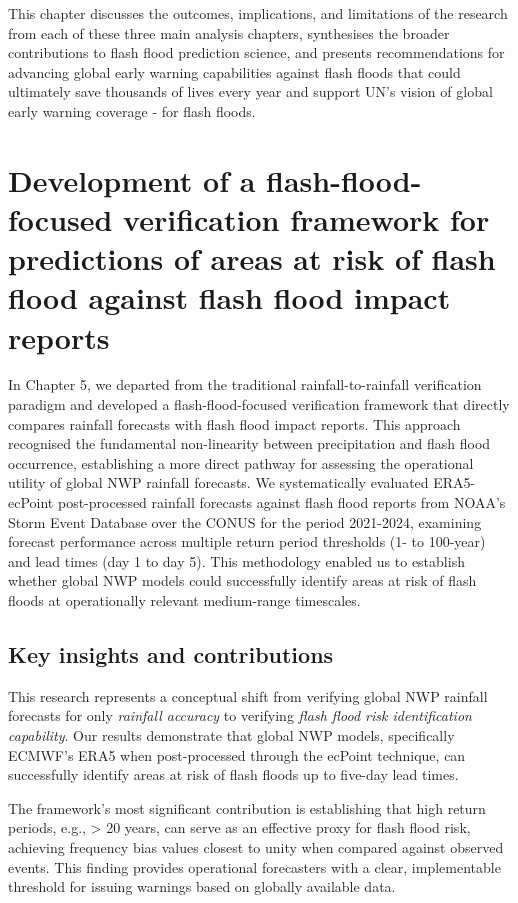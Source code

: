 This chapter discusses the outcomes, implications, and limitations of the research from each of these three main analysis chapters, synthesises the broader contributions to flash flood prediction science, and presents recommendations for advancing global early warning capabilities against flash floods that could ultimately save thousands of lives every year and support UN's vision of global early warning coverage - for flash floods.


\section{Development of a flash-flood-focused verification framework for predictions of areas at risk of flash flood against flash flood impact reports}

In Chapter 5, we departed from the traditional rainfall-to-rainfall verification paradigm and developed a flash-flood-focused verification framework that directly compares rainfall forecasts with flash flood impact reports. This approach recognised the fundamental non-linearity between precipitation and flash flood occurrence, establishing a more direct pathway for assessing the operational utility of global NWP rainfall forecasts. We systematically evaluated ERA5-ecPoint post-processed rainfall forecasts against flash flood reports from NOAA's Storm Event Database over the CONUS for the period 2021-2024, examining forecast performance across multiple return period thresholds (1- to 100-year) and lead times (day 1 to day 5). This methodology enabled us to establish whether global NWP models could successfully identify areas at risk of flash floods at operationally relevant medium-range timescales.

\subsection{Key insights and contributions}

This research represents a conceptual shift from verifying global NWP rainfall forecasts for only \textit{rainfall accuracy} to verifying \textit{flash flood risk identification capability}. Our results demonstrate that global NWP models, specifically ECMWF's ERA5 when post-processed through the ecPoint technique, can successfully identify areas at risk of flash floods up to five-day lead times. %

The framework's most significant contribution is establishing that high return periods, e.g., > 20 years, can serve as an effective proxy for flash flood risk, achieving frequency bias values closest to unity when compared against observed events. This finding provides operational forecasters with a clear, implementable threshold for issuing warnings based on globally available data.

